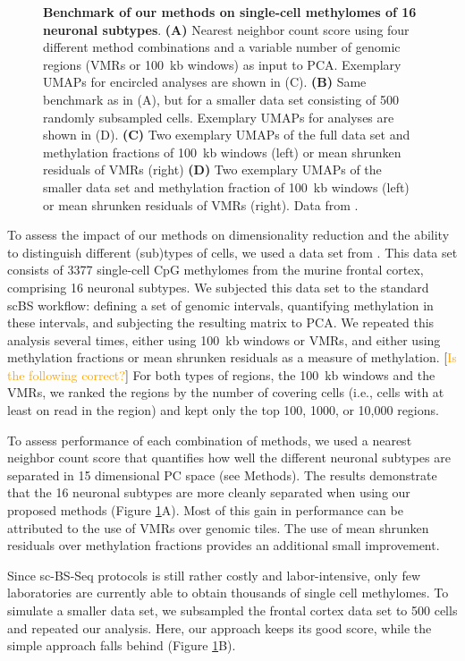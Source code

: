 \documentclass[twocolumn,10pt]{article}
\newcommand{\todo}[1]{[\textcolor{orange}{#1}]}
\begin{document}
\begin{figure}
\begin{center}
		\caption{\small \textbf{Benchmark of our methods on single-cell methylomes of 16 neuronal subtypes}. \textbf{(A)} Nearest neighbor count score using four different method combinations and a variable number of genomic regions (VMRs or 100~kb windows) as input to PCA. Exemplary UMAPs for encircled analyses are shown in (C). \textbf{(B)} Same benchmark as in (A), but for a smaller data set consisting of 500 randomly subsampled cells. Exemplary UMAPs for analyses are shown in (D). \textbf{(C)} Two exemplary UMAPs of the full data set and methylation fractions of 100~kb windows (left) or mean shrunken residuals of VMRs (right) \textbf{(D)} Two exemplary UMAPs of the smaller data set and methylation fraction of 100~kb windows (left) or mean shrunken residuals of VMRs (right). Data from \citet{luo2017single}.}
		\label{figure:score}
	\end{center}
\end{figure}

To assess the impact of our methods on dimensionality reduction and the ability to distinguish different (sub)types of cells, we used a data set from \citet{luo2017single}. This data set consists of 3377 single-cell CpG methylomes from the murine frontal cortex, comprising 16 neuronal subtypes.
We subjected this data set to the standard scBS workflow: defining a set of genomic intervals, quantifying methylation in these intervals, and subjecting the resulting matrix to PCA.
We repeated this analysis several times, either using 100~kb windows or VMRs, and either using methylation fractions or mean shrunken residuals as a measure of methylation. \todo{Is the following correct?} For both types of regions, the 100~kb windows and the VMRs, we ranked the regions by the number of covering cells (i.e., cells with at least on read in the region) and kept only the top 100, 1000, or 10,000 regions.

To assess performance of each combination of methods, we used a nearest neighbor count score that quantifies how well the different neuronal subtypes are separated in 15 dimensional PC space (see Methods).
The results demonstrate that the 16 neuronal subtypes are more cleanly separated when using our proposed methods (Figure \ref{figure:score}A).
Most of this gain in performance can be attributed to the use of VMRs over genomic tiles. The use of mean shrunken residuals over methylation fractions provides an additional small improvement.

Since sc-BS-Seq protocols is still rather costly and labor-intensive, only few laboratories are currently able to obtain thousands of single cell methylomes.
To simulate a smaller data set, we subsampled the frontal cortex data set to 500 cells and repeated our analysis.
Here, our approach keeps its good score, while the simple approach falls behind (Figure \ref{figure:score}B).
\end{document}
